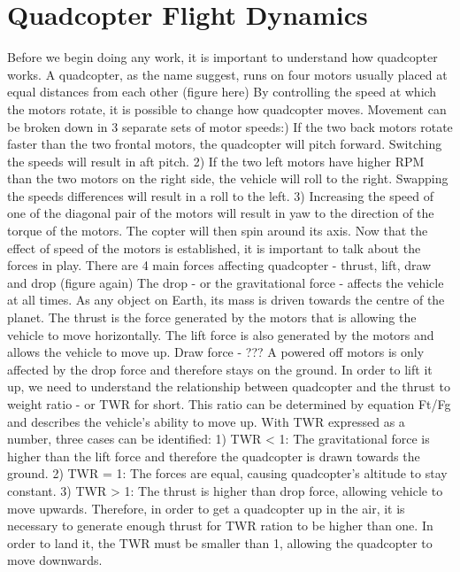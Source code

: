\section{Quadcopter Flight Dynamics}
Before we begin doing any work, it is important to understand how quadcopter works. A quadcopter, as the name suggest, runs on four motors usually placed at equal distances from each other (figure here) \newline
By controlling the speed at which the motors rotate, it is possible to change how quadcopter moves. Movement can be broken down in 3 separate sets of motor speeds:) If the two back motors rotate faster than the two frontal motors, the quadcopter will pitch forward. Switching the speeds will result in aft pitch.
2) If the two left motors have higher RPM than the two motors on the right side, the vehicle will roll to the right. Swapping the speeds differences will result in a roll to the left.
3) Increasing the speed of one of the diagonal pair of the motors will result in yaw to the direction of the torque of the motors. The copter will then spin around its axis.\newline
Now that the effect of speed of the motors is established, it is important to talk about the forces in play. There are 4 main forces affecting quadcopter - thrust, lift, draw and drop (figure again)\newline
The drop - or the gravitational force - affects the vehicle at all times. As any object on Earth, its mass is driven towards the centre of the planet.\newline
The thrust is the force generated by the motors that is allowing the vehicle to move horizontally.\newline
The lift force is also generated by the motors and allows the vehicle to move up.\newline
Draw force - ???\newline
A powered off motors is only affected by the drop force and therefore stays on the ground. In order to lift it up, we need to understand the relationship between quadcopter and the thrust to weight ratio - or TWR for short. This ratio can be determined by equation Ft/Fg and describes the vehicle's ability to move up. With TWR expressed as a number, three cases can be identified:
1) TWR < 1: The gravitational force is higher than the lift force and therefore the quadcopter is drawn towards the ground.
2) TWR = 1: The forces are equal, causing quadcopter's altitude to stay constant.
3) TWR > 1: The thrust is higher than drop force, allowing vehicle to move upwards.\newline
Therefore, in order to get a quadcopter up in the air, it is necessary to generate enough thrust for TWR ration to be higher than one. In order to land it, the TWR must be smaller than 1, allowing the quadcopter to move downwards.\newline
